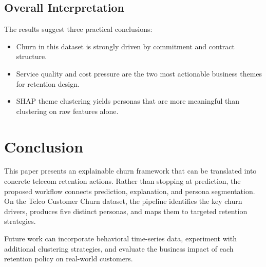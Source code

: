 \documentclass[conference]{IEEEtran}
\begin{document}
\subsection{Overall Interpretation}
The results suggest three practical conclusions:
\begin{itemize}[leftmargin=*]
    \item Churn in this dataset is strongly driven by commitment and contract structure.
    \item Service quality and cost pressure are the two most actionable business themes for retention design.
    \item SHAP theme clustering yields personas that are more meaningful than clustering on raw features alone.
\end{itemize}

\section{Conclusion}
This paper presents an explainable churn framework that can be translated into concrete telecom retention actions. Rather than stopping at prediction, the proposed workflow connects prediction, explanation, and persona segmentation. On the Telco Customer Churn dataset, the pipeline identifies the key churn drivers, produces five distinct personas, and maps them to targeted retention strategies.

Future work can incorporate behavioral time-series data, experiment with additional clustering strategies, and evaluate the business impact of each retention policy on real-world customers.

\balance



\end{document}
